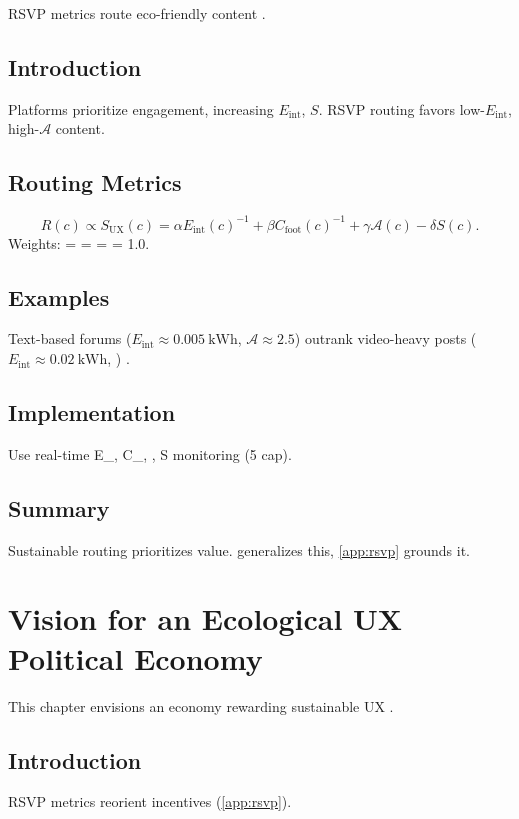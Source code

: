 \documentclass[openany]{book}
\newcommand{\Sent}{S} %
\newcommand{\Eint}{E_{\mathrm{int}}} %
\newcommand{\Cfoot}{C_{\mathrm{foot}}} %
\newcommand{\Auton}{\mathcal{A}} %
\newcommand{\SUX}{S_{\mathrm{UX}}} %
\newcommand{\kWh}{\mathrm{kWh}}
\begin{document}
RSVP metrics route eco-friendly content \citep{doctorow2022,designlab2024}.

\section{Introduction}
\label{sec:routing-intro}
Platforms prioritize engagement, increasing \(\Eint\), \(\Sent\). RSVP routing favors low-\(\Eint\), high-\(\Auton\) content.

\section{Routing Metrics}
\label{sec:routing-metrics}
\begin{equation}
\label{eq:routing}
R(c) \propto \SUX(c) = \alpha \Eint(c)^{-1} + \beta \Cfoot(c)^{-1} + \gamma \Auton(c) - \delta \Sent(c).
\end{equation}
Weights: \alpha = \beta = \gamma = \delta = 1.0.

\section{Examples}
\label{sec:routing-examples}
Text-based forums (\(\Eint \approx \SI{0.005}{\kWh}\), \(\Auton \approx 2.5\)) outrank video-heavy posts (\(\Eint \approx \SI{0.02}{\kWh}\), \Auton {}) \citep{doctorow2022}.

\section{Implementation}
\label{sec:routing-impl}
Use real-time \Eint{}, \Cfoot{}, \Auton{}, \Sent{} monitoring (\SI{5}{} cap).

\section{Summary}
Sustainable routing prioritizes value.  generalizes this, \cref{app:rsvp} grounds it.

\chapter{Vision for an Ecological UX Political Economy}
\label{ch:vision}

This chapter envisions an economy rewarding sustainable UX \citep{colak2024,doctorow2022}.

\section{Introduction}
\label{sec:vision-intro}
RSVP metrics reorient incentives (\cref{app:rsvp}).
\end{document}
